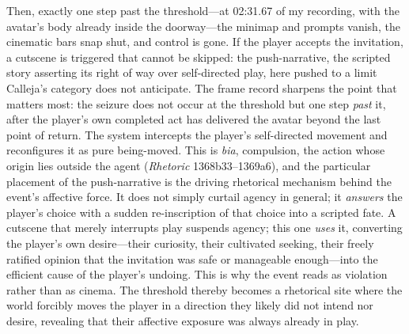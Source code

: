 Then, exactly one step past the threshold---at 02:31.67 of my recording, with the avatar's body already inside the doorway---the minimap and prompts vanish, the cinematic bars snap shut, and control is gone. If the player accepts the invitation, a cutscene is triggered that cannot be skipped: the push-narrative, the scripted story asserting its right of way over self-directed play, here pushed to a limit Calleja's category does not anticipate. The frame record sharpens the point that matters most: the seizure does not occur at the threshold but one step \textit{past} it, after the player's own completed act has delivered the avatar beyond the last point of return. The system intercepts the player's self-directed movement and reconfigures it as pure being-moved. This is \textit{bia}, compulsion, the action whose origin lies outside the agent (\textit{Rhetoric} 1368b33--1369a6), and the particular placement of the push-narrative is the driving rhetorical mechanism behind the event's affective force. It does not simply curtail agency in general; it \textit{answers} the player's choice with a sudden re-inscription of that choice into a scripted fate. A cutscene that merely interrupts play suspends agency; this one \textit{uses} it, converting the player's own desire---their curiosity, their cultivated seeking, their freely ratified opinion that the invitation was safe or manageable enough---into the efficient cause of the player's undoing. This is why the event reads as violation rather than as cinema. The threshold thereby becomes a rhetorical site where the world forcibly moves the player in a direction they likely did not intend nor desire, revealing that their affective exposure was always already in play.
